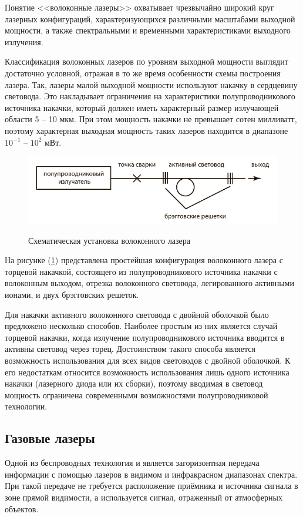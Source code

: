 \documentclass[14pt,pscyr,titlepage]{hedreport}
\begin{document}
		Понятие <<волоконные лазеры>> охватывает чрезвычайно широкий круг 
		лазерных конфигураций, характеризующихся различными масштабами 
		выходной мощности, а также спектральными и временными характеристиками 
		выходного излучения. 

		Классификация волоконных лазеров по уровням выходной мощности выглядит 
		достаточно условной, отражая в то же время особенности схемы 
		построения лазера. Так, лазеры малой выходной мощности используют 
		накачку в сердцевину световода. Это накладывает ограничения на 
		характеристики полупроводникового источника накачки, который должен 
		иметь характерный размер излучающей области 5 -- 10 мкм. При этом 
		мощность накачки не превышает сотен милливатт, поэтому характерная 
		выходная мощность таких лазеров находится в диапазоне 
		\( 10^{-1} \) -- \( 10^{2} \) мВт.  

		\begin{figure}[!ht]
			\center
			\includegraphics[width=.8\textwidth]{fiber_laser} \\
			\caption{Схематическая установка волоконного лазера}
			\label{img:fiber01}
		\end{figure}

		На рисунке (\ref{img:fiber01}) представлена простейшая конфигурация 
		волоконного лазера с торцевой накачкой, состоящего из 
		полупроводникового источника накачки с волоконным выходом, отрезка 
		волоконного световода, легированного активными ионами, и двух 
		брэгговских решеток. 

		Для накачки активного волоконного световода с двойной оболочкой было 
		предложено несколько способов. Наиболее простым из них является случай 
		торцевой накачки, когда излучение полупроводникового источника 
		вводится в активны световод через торец. Достоинством такого способа 
		является возможность использования для всех видов световодов с 
		двойной оболочкой. К его недостаткам относится возможность 
		использования лишь одного источника накачки (лазерного диода или их 
		сборки), поэтому вводимая в световод мощность ограничена современными 
		возможностями полупроводниковой технологии.

	\subsection{Газовые лазеры}
		Одной из беспроводных технология и является загоризонтная передача 
		информации с помощью лазеров в видимом и инфракрасном диапазонах 
		спектра. При такой передаче не требуется расположение приёмника и 
		источника сигнала в зоне прямой видимости, а используется сигнал, 
		отраженный от атмосферных объектов.
\end{document}
